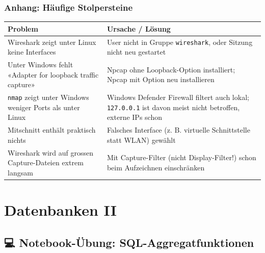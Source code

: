 \documentclass[
  nswissgerman,
  a4paper,
  DIV=11,
  numbers=noendperiod,
  ngerman]{scrreprt}
\newcounter{none} %
\begin{document}
\section{Anhang: Häufige
Stolpersteine}\label{anhang-huxe4ufige-stolpersteine}

{\def\LTcaptype{none} %
\begin{longtable}[]{@{}
  >{\raggedright\arraybackslash}p{}
  >{\raggedright\arraybackslash}p{}@{}}
\toprule\noalign{}
\begin{minipage}[b]{\linewidth}\raggedright
Problem
\end{minipage} & \begin{minipage}[b]{\linewidth}\raggedright
Ursache / Lösung
\end{minipage} \\
\midrule\noalign{}
\endhead
\bottomrule\noalign{}
\endlastfoot
Wireshark zeigt unter Linux keine Interfaces & User nicht in Gruppe
\texttt{wireshark}, oder Sitzung nicht neu gestartet \\
Unter Windows fehlt «Adapter for loopback traffic capture» & Npcap ohne
Loopback-Option installiert; Npcap mit Option neu installieren \\
\texttt{nmap} zeigt unter Windows weniger Ports als unter Linux &
Windows Defender Firewall filtert auch lokal; \texttt{127.0.0.1} ist
davon meist nicht betroffen, externe IPs schon \\
Mitschnitt enthält praktisch nichts & Falsches Interface (z. B.
virtuelle Schnittstelle statt WLAN) gewählt \\
Wireshark wird auf grossen Capture-Dateien extrem langsam & Mit
Capture-Filter (nicht Display-Filter!) schon beim Aufzeichnen
einschränken \\
\end{longtable}
}

\part{Datenbanken II}

\chapter{💻 Notebook-Übung:
SQL-Aggregatfunktionen}\label{notebook-uxfcbung-sql-aggregatfunktionen}
\end{document}
